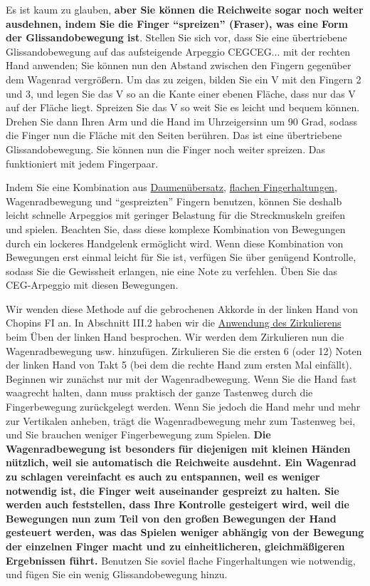 Es ist kaum zu glauben, \textbf{aber Sie können die Reichweite sogar noch weiter ausdehnen, indem Sie die Finger \enquote{spreizen} (Fraser), was eine Form der Glissandobewegung ist}.
Stellen Sie sich vor, dass Sie eine übertriebene Glissandobewegung auf das aufsteigende Arpeggio CEGCEG... mit der rechten Hand anwenden;
Sie können nun den Abstand zwischen den Fingern gegenüber dem Wagenrad vergrößern.
Um das zu zeigen, bilden Sie ein V mit den Fingern 2 und 3, und legen Sie das V so an die Kante einer ebenen Fläche, dass nur das V auf der Fläche liegt.
Spreizen Sie das V so weit Sie es leicht und bequem können.
Drehen Sie dann Ihren Arm und die Hand im Uhrzeigersinn um 90 Grad, sodass die Finger nun die Fläche mit den Seiten berühren.
Das ist eine übertriebene Glissandobewegung.
Sie können nun die Finger noch weiter spreizen.
Das funktioniert mit jedem Fingerpaar.

Indem Sie eine Kombination aus \hyperlink{c1iii5a}{Daumenübersatz}, \hyperlink{c1iii4b}{flachen Fingerhaltungen}, Wagenradbewegung und \enquote{gespreizten} Fingern benutzen, können Sie deshalb leicht schnelle Arpeggios mit geringer Belastung für die Streckmuskeln greifen und spielen.
Beachten Sie, dass diese komplexe Kombination von Bewegungen durch ein lockeres Handgelenk ermöglicht wird.
Wenn diese Kombination von Bewegungen erst einmal leicht für Sie ist, verfügen Sie über genügend Kontrolle, sodass Sie die Gewissheit erlangen, nie eine Note zu verfehlen.
Üben Sie das CEG-Arpeggio mit diesen Bewegungen.

Wir wenden diese Methode auf die gebrochenen Akkorde in der linken Hand von Chopins FI an.
In Abschnitt III.2 haben wir die \hyperlink{c1iii2}{Anwendung des Zirkulierens} beim Üben der linken Hand besprochen.
Wir werden dem Zirkulieren nun die Wagenradbewegung usw. hinzufügen.
Zirkulieren Sie die ersten 6 (oder 12) Noten der linken Hand von Takt 5 (bei dem die rechte Hand zum ersten Mal einfällt).
Beginnen wir zunächst nur mit der Wagenradbewegung.
Wenn Sie die Hand fast waagrecht halten, dann muss praktisch der ganze Tastenweg durch die Fingerbewegung zurückgelegt werden.
Wenn Sie jedoch die Hand mehr und mehr zur Vertikalen anheben, trägt die Wagenradbewegung mehr zum Tastenweg bei, und Sie brauchen weniger Fingerbewegung zum Spielen.
\textbf{Die Wagenradbewegung ist besonders für diejenigen mit kleinen Händen nützlich, weil sie automatisch die Reichweite ausdehnt.
Ein Wagenrad zu schlagen vereinfacht es auch zu entspannen, weil es weniger notwendig ist, die Finger weit auseinander gespreizt zu halten.
Sie werden auch feststellen, dass Ihre Kontrolle gesteigert wird, weil die Bewegungen nun zum Teil von den großen Bewegungen der Hand gesteuert werden, was das Spielen weniger abhängig von der Bewegung der einzelnen Finger macht und zu einheitlicheren, gleichmäßigeren Ergebnissen führt.}
Benutzen Sie soviel flache Fingerhaltungen wie notwendig, und fügen Sie ein wenig Glissandobewegung hinzu.  


